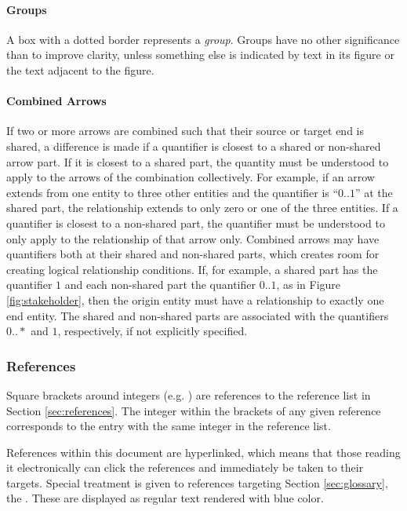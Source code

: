 \paragraph{Groups}
A box with a dotted border represents a \textit{group}.
Groups have no other significance than to improve clarity, unless something else is indicated by text in its figure or the text adjacent to the figure.

\paragraph{Combined Arrows}
If two or more arrows are combined such that their source or target end is shared, a difference is made if a quantifier is closest to a shared or non-shared arrow part.
If it is closest to a shared part, the quantity must be understood to apply to the arrows of the combination collectively.
For example, if an arrow extends from one entity to three other entities and the quantifier is ``$0..1$'' at the shared part, the relationship extends to only zero or one of the three entities.
If a quantifier is closest to a non-shared part, the quantifier must be understood to only apply to the relationship of that arrow only.
Combined arrows may have quantifiers both at their shared and non-shared parts, which creates room for creating logical relationship conditions.
If, for example, a shared part has the quantifier $1$ and each non-shared part the quantifier $0..1$, as in Figure \ref{fig:stakeholder}, then the origin entity must have a relationship to exactly one end entity.
The shared and non-shared parts are associated with the quantifiers $0..*$ and $1$, respectively, if not explicitly specified.

\subsubsection{References}

Square brackets around integers (e.g. \cite{delsing2017iot}) are references to the reference list in Section \ref{sec:references}.
The integer within the brackets of any given reference corresponds to the entry with the same integer in the reference list.

References within this document are hyperlinked, which means that those reading it electronically can click the references and immediately be taken to their targets.
Special treatment is given to references targeting Section \ref{sec:glossary}, the .
These are displayed as regular text rendered with blue color.

